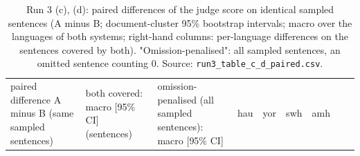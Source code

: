 \begin{table}[t]
\centering
\scriptsize
\setlength{\tabcolsep}{3pt}
\caption{Run 3 (c), (d): paired differences of the judge score on identical sampled sentences (A minus B; document-cluster 95\% bootstrap intervals; macro over the languages of both systems; right-hand columns: per-language differences on the sentences covered by both). "Omission-penalised": all sampled sentences, an omitted sentence counting 0. Source: \texttt{run3\_table\_c\_d\_paired.csv}.}
\label{tab:t_judge_j2_run3_paired}
{\def\LTcaptype{none} %
\begin{tabular}{@{}
  >{\raggedright\arraybackslash}p{}
  >{\raggedleft\arraybackslash}p{}
  >{\raggedleft\arraybackslash}p{}
  >{\raggedleft\arraybackslash}p{}
  >{\raggedleft\arraybackslash}p{}
  >{\raggedleft\arraybackslash}p{}
  >{\raggedleft\arraybackslash}p{}
  >{\raggedleft\arraybackslash}p{}
  >{\raggedleft\arraybackslash}p{}@{}}
\toprule
\begin{minipage}[b]{\linewidth}\raggedright
paired difference A minus B (same sampled sentences)
\end{minipage} & \begin{minipage}[b]{\linewidth}\raggedleft
both covered: macro {[}95\% CI{]} (sentences)
\end{minipage} & \begin{minipage}[b]{\linewidth}\raggedleft
omission-penalised (all sampled sentences): macro {[}95\% CI{]}
\end{minipage} & \begin{minipage}[b]{\linewidth}\raggedleft
hau
\end{minipage} & \begin{minipage}[b]{\linewidth}\raggedleft
yor
\end{minipage} & \begin{minipage}[b]{\linewidth}\raggedleft
swh
\end{minipage} & \begin{minipage}[b]{\linewidth}\raggedleft
amh
\end{minipage} & \begin{minipage}[b]{\linewidth}\raggedleft

\end{minipage}
\end{tabular}}
\end{table}
